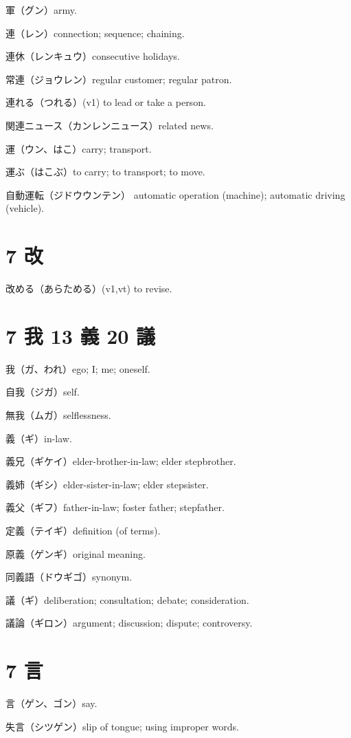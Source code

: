 軍（グン）army.

連（レン）connection; sequence; chaining.

連休（レンキュウ）consecutive holidays.

常連（ジョウレン）regular customer; regular patron.

連れる（つれる）(v1) to lead or take a person.

関連ニュース（カンレンニュース）related news.

運（ウン、はこ）carry; transport.

運ぶ（はこぶ）to carry; to transport; to move.

自動運転（ジドウウンテン）
automatic operation (machine); automatic driving (vehicle).

\section{7 改}

改める（あらためる）(v1,vt) to revise.

\section{7 我 13 義 20 議}

我（ガ、われ）ego; I; me; oneself.

自我（ジガ）self.

無我（ムガ）selflessness.

義（ギ）in-law.

義兄（ギケイ）elder-brother-in-law; elder stepbrother.

義姉（ギシ）elder-sister-in-law; elder stepsister.

義父（ギフ）father-in-law; foster father; stepfather.

定義（テイギ）definition (of terms).

原義（ゲンギ）original meaning.

同義語（ドウギゴ）synonym.

議（ギ）deliberation; consultation; debate; consideration.

議論（ギロン）argument; discussion; dispute; controversy.

\section{7 言}

言（ゲン、ゴン）say.

失言（シツゲン）slip of tongue; using improper words.

